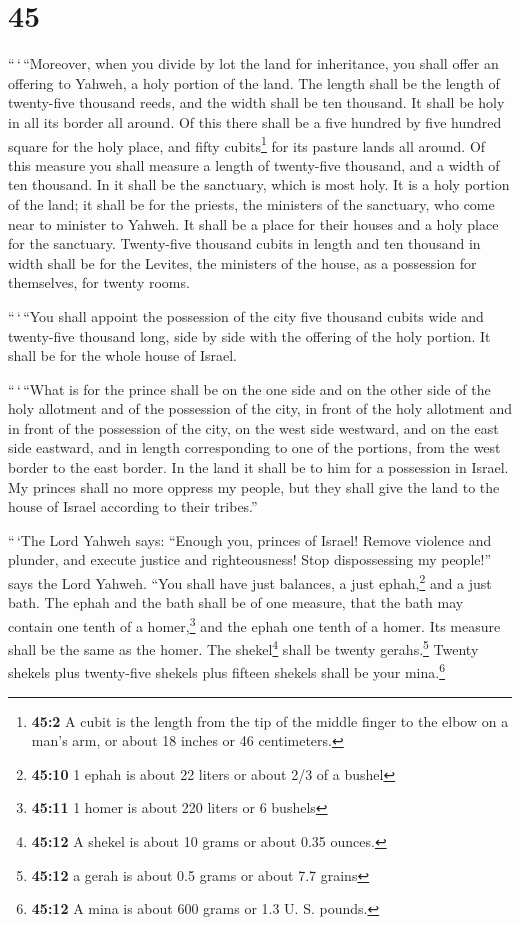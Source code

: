 \hypertarget{section-44}{%
\section{45}\label{section-44}}

 ``\,`\,``Moreover, when you divide by lot the land for
inheritance, you shall offer an offering to Yahweh, a holy portion of
the land. The length shall be the length of twenty-five thousand reeds,
and the width shall be ten thousand. It shall be holy in all its border
all around.  Of this there shall be a five hundred by five
hundred square for the holy place, and fifty cubits\footnote{\textbf{45:2}
  A cubit is the length from the tip of the middle finger to the elbow
  on a man's arm, or about 18 inches or 46 centimeters.} for its pasture
lands all around.  Of this measure you shall measure a
length of twenty-five thousand, and a width of ten thousand. In it shall
be the sanctuary, which is most holy.  It is a holy
portion of the land; it shall be for the priests, the ministers of the
sanctuary, who come near to minister to Yahweh. It shall be a place for
their houses and a holy place for the sanctuary. 
Twenty-five thousand cubits in length and ten thousand in width shall be
for the Levites, the ministers of the house, as a possession for
themselves, for twenty rooms.

 ``\,`\,``You shall appoint the possession of the city
five thousand cubits wide and twenty-five thousand long, side by side
with the offering of the holy portion. It shall be for the whole house
of Israel.

 ``\,`\,``What is for the prince shall be on the one side
and on the other side of the holy allotment and of the possession of the
city, in front of the holy allotment and in front of the possession of
the city, on the west side westward, and on the east side eastward, and
in length corresponding to one of the portions, from the west border to
the east border.  In the land it shall be to him for a
possession in Israel. My princes shall no more oppress my people, but
they shall give the land to the house of Israel according to their
tribes.''

 ``\,`The Lord Yahweh says: ``Enough you, princes of
Israel! Remove violence and plunder, and execute justice and
righteousness! Stop dispossessing my people!'' says the Lord Yahweh.
 ``You shall have just balances, a just ephah,\footnote{\textbf{45:10}
  1 ephah is about 22 liters or about 2/3 of a bushel} and a just bath.
 The ephah and the bath shall be of one measure, that the
bath may contain one tenth of a homer,\footnote{\textbf{45:11} 1 homer
  is about 220 liters or 6 bushels} and the ephah one tenth of a homer.
Its measure shall be the same as the homer.  The
shekel\footnote{\textbf{45:12} A shekel is about 10 grams or about 0.35
  ounces.} shall be twenty gerahs.\footnote{\textbf{45:12} a gerah is
  about 0.5 grams or about 7.7 grains} Twenty shekels plus twenty-five
shekels plus fifteen shekels shall be your mina.\footnote{\textbf{45:12}
  A mina is about 600 grams or 1.3 U. S. pounds.}

